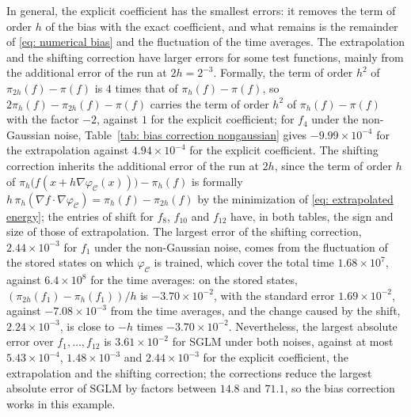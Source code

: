 In general, the explicit coefficient has the smallest errors: it removes the term of order $h$ of the bias with the exact coefficient, and what remains is the remainder of \eqref{eq: numerical bias} and the fluctuation of the time averages. The extrapolation and the shifting correction have larger errors for some test functions, mainly from the additional error of the run at $2h = 2^{-3}$. Formally, the term of order $h^2$ of $\pi_{2h}(f) - \pi(f)$ is $4$ times that of $\pi_h(f) - \pi(f)$, so $2\pi_h(f) - \pi_{2h}(f) - \pi(f)$ carries the term of order $h^2$ of $\pi_h(f) - \pi(f)$ with the factor $-2$, against $1$ for the explicit coefficient; for $f_4$ under the non-Gaussian noise, Table~\ref{tab: bias correction nongaussian} gives $-9.99\times10^{-4}$ for the extrapolation against $4.94\times10^{-4}$ for the explicit coefficient. The shifting correction inherits the additional error of the run at $2h$, since the term of order $h$ of $\pi_h\bigl( f(x + h \nabla \varphi_{\mathcal C}(x)) \bigr) - \pi_h(f)$ is formally $h\, \pi_h(\nabla f \cdot \nabla \varphi_{\mathcal C}) = \pi_h(f) - \pi_{2h}(f)$ by the minimization of \eqref{eq: extrapolated energy}; the entries of shift for $f_8$, $f_{10}$ and $f_{12}$ have, in both tables, the sign and size of those of extrapolation. The largest error of the shifting correction, $2.44\times10^{-3}$ for $f_1$ under the non-Gaussian noise, comes from the fluctuation of the stored states on which $\varphi_{\mathcal C}$ is trained, which cover the total time $1.68 \times 10^7$, against $6.4 \times 10^8$ for the time averages: on the stored states, $(\pi_{2h}(f_1) - \pi_h(f_1))/h$ is $-3.70\times10^{-2}$, with the standard error $1.69\times10^{-2}$, against $-7.08\times10^{-3}$ from the time averages, and the change caused by the shift, $2.24\times10^{-3}$, is close to $-h$ times $-3.70\times10^{-2}$. Nevertheless, the largest absolute error over $f_1, \dots, f_{12}$ is $3.61\times10^{-2}$ for SGLM under both noises, against at most $5.43\times10^{-4}$, $1.48\times10^{-3}$ and $2.44\times10^{-3}$ for the explicit coefficient, the extrapolation and the shifting correction; the corrections reduce the largest absolute error of SGLM by factors between $14.8$ and $71.1$, so the bias correction works in this example.
